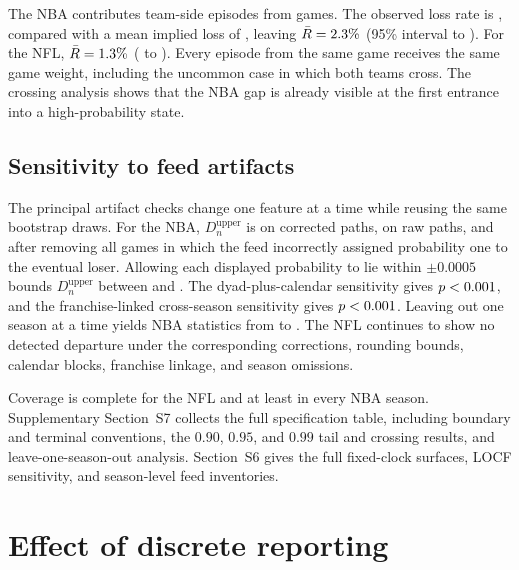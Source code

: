 \documentclass[12pt,letterpaper]{article}  %
\theoremstyle{plain}
\theoremstyle{definition}
\begin{document}
The NBA contributes \NBACrossingNinetyFiveEpisodes{} team-side episodes from \NBACrossingNinetyFiveGames{} games.
The observed loss rate is \NBACrossingNinetyFiveLoss{}, compared with a mean implied loss of \NBACrossingNinetyFiveImplied{}, leaving $\bar R=2.3\%$ (95\% interval \NBACrossingNinetyFiveCILower{} to \NBACrossingNinetyFiveCIUpper{}).
For the NFL, $\bar R=1.3\%$ (\NFLCrossingNinetyFiveCILower{} to \NFLCrossingNinetyFiveCIUpper{}).
Every episode from the same game receives the same game weight, including the uncommon case in which both teams cross.
The crossing analysis shows that the NBA gap is already visible at the first entrance into a high-probability state.

\subsection{Sensitivity to feed artifacts}

The principal artifact checks change one feature at a time while reusing the same bootstrap draws.
For the NBA, $D_n^{\mathrm{upper}}$ is \NBAGlobalD{} on corrected paths, \NBARawGlobalD{} on raw paths, and \NBAExcludePatchedGlobalD{} after removing all \NBAPatchedGames{} games in which the feed incorrectly assigned probability one to the eventual loser.
Allowing each displayed probability to lie within $\pm0.0005$ bounds $D_n^{\mathrm{upper}}$ between \NBARoundingLowerGlobalD{} and \NBARoundingUpperGlobalD{}.
The dyad-plus-calendar sensitivity gives $p<0.001$, and the franchise-linked cross-season sensitivity gives $p<0.001$.
Leaving out one season at a time yields NBA statistics from \NBALOSODMin{} to \NBALOSODMax{}.
The NFL continues to show no detected departure under the corresponding corrections, rounding bounds, calendar blocks, franchise linkage, and season omissions.

Coverage is complete for the NFL and at least \NBAMinimumFeedCoverage{} in every NBA season.
Supplementary Section~S7 collects the full specification table, including boundary and terminal conventions, the $0.90$, $0.95$, and $0.99$ tail and crossing results, and leave-one-season-out analysis.
Section~S6 gives the full fixed-clock surfaces, LOCF sensitivity, and season-level feed inventories.

\section{Effect of discrete reporting} \label{sec:simulation}
\end{document}
